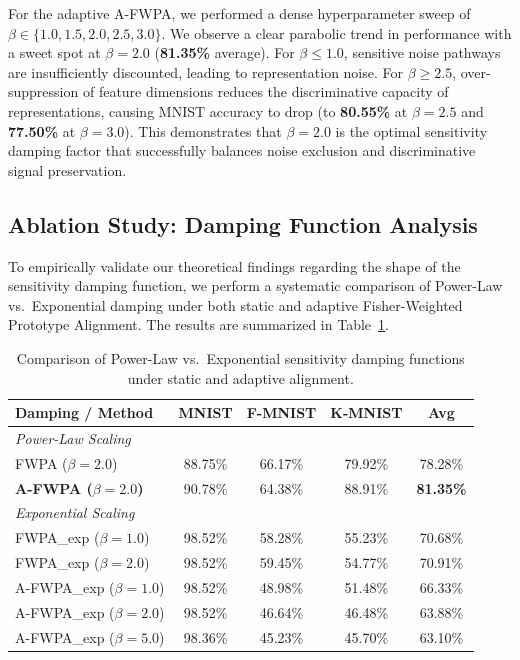 \documentclass{article}
\theoremstyle{plain}
\theoremstyle{definition}
\theoremstyle{remark}
\begin{document}
For the adaptive A-FWPA, we performed a dense hyperparameter sweep of $\beta \in \{1.0, 1.5, 2.0, 2.5, 3.0\}$. We observe a clear parabolic trend in performance with a sweet spot at $\beta = 2.0$ (\textbf{81.35\%} average). For $\beta \le 1.0$, sensitive noise pathways are insufficiently discounted, leading to representation noise. For $\beta \ge 2.5$, over-suppression of feature dimensions reduces the discriminative capacity of representations, causing MNIST accuracy to drop (to \textbf{80.55\%} at $\beta=2.5$ and \textbf{77.50\%} at $\beta=3.0$). This demonstrates that $\beta=2.0$ is the optimal sensitivity damping factor that successfully balances noise exclusion and discriminative signal preservation.

\subsection{Ablation Study: Damping Function Analysis}
To empirically validate our theoretical findings regarding the shape of the sensitivity damping function, we perform a systematic comparison of Power-Law vs.\ Exponential damping under both static and adaptive Fisher-Weighted Prototype Alignment. The results are summarized in Table~\ref{tab:damping_ablation}.

\begin{table}[h]
\caption{Comparison of Power-Law vs.\ Exponential sensitivity damping functions under static and adaptive alignment.}
\label{tab:damping_ablation}
\vskip 0.15in
\begin{center}
\scriptsize
\setlength{\tabcolsep}{3pt}
\begin{tabular}{lcccc}
\toprule
\textbf{Damping / Method} & \textbf{MNIST} & \textbf{F-MNIST} & \textbf{K-MNIST} & \textbf{Avg} \\
\midrule
\textit{Power-Law Scaling} \\
FWPA ($\beta = 2.0$) & 88.75\% & 66.17\% & 79.92\% & 78.28\% \\
\textbf{A-FWPA ($\beta = \mathbf{2.0}$)} & 90.78\% & 64.38\% & 88.91\% & \textbf{81.35\%} \\
\midrule
\textit{Exponential Scaling} \\
FWPA\_exp ($\beta = 1.0$) & 98.52\% & 58.28\% & 55.23\% & 70.68\% \\
FWPA\_exp ($\beta = 2.0$) & 98.52\% & 59.45\% & 54.77\% & 70.91\% \\
A-FWPA\_exp ($\beta = 1.0$) & 98.52\% & 48.98\% & 51.48\% & 66.33\% \\
A-FWPA\_exp ($\beta = 2.0$) & 98.52\% & 46.64\% & 46.48\% & 63.88\% \\
A-FWPA\_exp ($\beta = 5.0$) & 98.36\% & 45.23\% & 45.70\% & 63.10\% \\
\bottomrule
\end{tabular}
\end{center}
\vskip -0.1in
\end{table}
\end{document}
